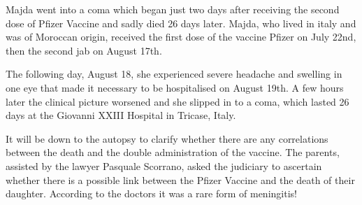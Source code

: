 Majda went into a coma which began just two days after receiving the second dose
of Pfizer Vaccine and sadly died 26 days later. Majda, who lived in italy and
was of Moroccan origin, received the first dose of the vaccine Pfizer on July
22nd, then the second jab on August 17th.

The following day, August 18, she experienced severe headache and swelling in
one eye that made it necessary to be hospitalised on August 19th. A few hours
later the clinical picture worsened and she slipped in to a coma, which lasted
26 days at the Giovanni XXIII Hospital in Tricase, Italy.

It will be down to the autopsy to clarify whether there are any correlations
between the death and the double administration of the vaccine. The parents,
assisted by the lawyer Pasquale Scorrano, asked the judiciary to ascertain
whether there is a possible link between the Pfizer Vaccine and the death of
their daughter. According to the doctors it was a rare form of meningitis!

